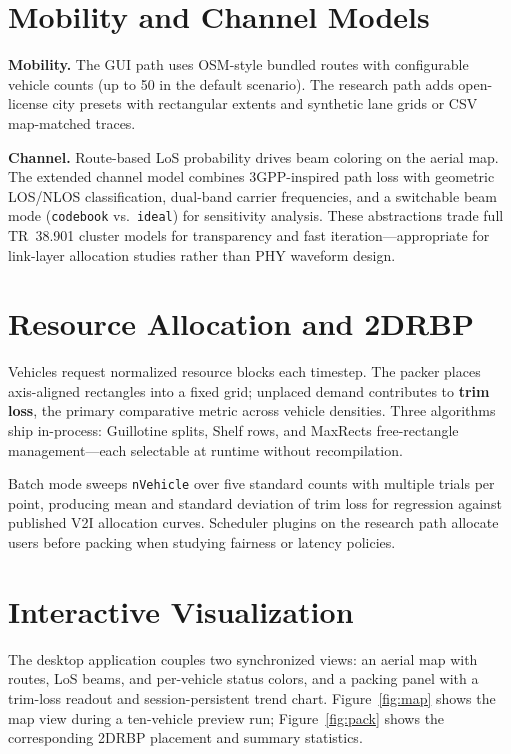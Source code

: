 \documentclass[conference]{IEEEtran}
\begin{document}
\section{Mobility and Channel Models}
\textbf{Mobility.} The GUI path uses OSM-style bundled routes with configurable vehicle counts (up to 50 in the default scenario).
The research path adds open-license city presets with rectangular extents and synthetic lane grids or CSV map-matched traces.

\textbf{Channel.} Route-based LoS probability drives beam coloring on the aerial map.
The extended channel model combines 3GPP-inspired path loss with geometric LOS/NLOS classification, dual-band carrier frequencies, and a switchable beam mode (\texttt{codebook} vs.\ \texttt{ideal}) for sensitivity analysis.
These abstractions trade full TR~38.901 cluster models for transparency and fast iteration---appropriate for link-layer allocation studies rather than PHY waveform design.

\section{Resource Allocation and 2DRBP}
Vehicles request normalized resource blocks each timestep.
The packer places axis-aligned rectangles into a fixed grid; unplaced demand contributes to \textbf{trim loss}, the primary comparative metric across vehicle densities.
Three algorithms ship in-process: Guillotine splits, Shelf rows, and MaxRects free-rectangle management---each selectable at runtime without recompilation.

Batch mode sweeps \texttt{nVehicle} over five standard counts with multiple trials per point, producing mean and standard deviation of trim loss for regression against published V2I allocation curves.
Scheduler plugins on the research path allocate users before packing when studying fairness or latency policies.

\section{Interactive Visualization}
The desktop application couples two synchronized views: an aerial map with routes, LoS beams, and per-vehicle status colors, and a packing panel with a trim-loss readout and session-persistent trend chart.
Figure~\ref{fig:map} shows the map view during a ten-vehicle preview run; Figure~\ref{fig:pack} shows the corresponding 2DRBP placement and summary statistics.
\end{document}
